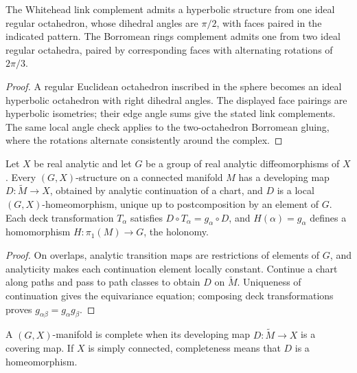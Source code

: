 \begin{proposition}
\label{thurston-ch03-octahedral-links}

The Whitehead link complement admits a hyperbolic structure from one ideal regular octahedron, whose dihedral angles are \(\pi/2\), with faces paired in the indicated pattern. The Borromean rings complement admits one from two ideal regular octahedra, paired by corresponding faces with alternating rotations of \(2\pi/3\).
\end{proposition}
\begin{proof}
\sketch A regular Euclidean octahedron inscribed in the sphere becomes an ideal hyperbolic octahedron with right dihedral angles. The displayed face pairings are hyperbolic isometries; their edge angle sums give the stated link complements. The same local angle check applies to the two-octahedron Borromean gluing, where the rotations alternate consistently around the complex.
\end{proof}

\begin{theorem}
\label{thurston-ch03-developing-map}

Let \(X\) be real analytic and let \(G\) be a group of real analytic diffeomorphisms of \(X\). Every \((G,X)\)-structure on a connected manifold \(M\) has a developing map \(D:\widetilde M\to X\), obtained by analytic continuation of a chart, and \(D\) is a local \((G,X)\)-homeomorphism, unique up to postcomposition by an element of \(G\). Each deck transformation \(T_\alpha\) satisfies \(D\circ T_\alpha=g_\alpha\circ D\), and \(H(\alpha)=g_\alpha\) defines a homomorphism \(H:\pi_1(M)\to G\), the holonomy.
\end{theorem}
\begin{proof}
\sketch On overlaps, analytic transition maps are restrictions of elements of \(G\), and analyticity makes each continuation element locally constant. Continue a chart along paths and pass to path classes to obtain \(D\) on \(\widetilde M\). Uniqueness of continuation gives the equivariance equation; composing deck transformations proves \(g_{\alpha\beta}=g_\alpha g_\beta\).
\end{proof}

\begin{definition}
\label{thurston-ch03-complete-structure}

A \((G,X)\)-manifold is complete when its developing map \(D:\widetilde M\to X\) is a covering map. If \(X\) is simply connected, completeness means that \(D\) is a homeomorphism.
\end{definition}

